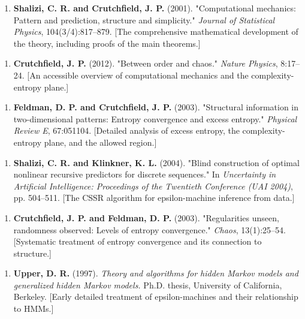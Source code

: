 \begin{enumerate}
\item \textbf{Shalizi, C. R. and Crutchfield, J. P.} (2001). "Computational mechanics: Pattern and prediction, structure and simplicity." \textit{Journal of Statistical Physics}, 104(3/4):817--879. [The comprehensive mathematical development of the theory, including proofs of the main theorems.]
\end{enumerate}

\begin{enumerate}
\item \textbf{Crutchfield, J. P.} (2012). "Between order and chaos." \textit{Nature Physics}, 8:17--24. [An accessible overview of computational mechanics and the complexity-entropy plane.]
\end{enumerate}

\begin{enumerate}
\item \textbf{Feldman, D. P. and Crutchfield, J. P.} (2003). "Structural information in two-dimensional patterns: Entropy convergence and excess entropy." \textit{Physical Review E}, 67:051104. [Detailed analysis of excess entropy, the complexity-entropy plane, and the allowed region.]
\end{enumerate}

\begin{enumerate}
\item \textbf{Shalizi, C. R. and Klinkner, K. L.} (2004). "Blind construction of optimal nonlinear recursive predictors for discrete sequences." In \textit{Uncertainty in Artificial Intelligence: Proceedings of the Twentieth Conference (UAI 2004)}, pp. 504--511. [The CSSR algorithm for epsilon-machine inference from data.]
\end{enumerate}

\begin{enumerate}
\item \textbf{Crutchfield, J. P. and Feldman, D. P.} (2003). "Regularities unseen, randomness observed: Levels of entropy convergence." \textit{Chaos}, 13(1):25--54. [Systematic treatment of entropy convergence and its connection to structure.]
\end{enumerate}

\begin{enumerate}
\item \textbf{Upper, D. R.} (1997). \textit{Theory and algorithms for hidden Markov models and generalized hidden Markov models.} Ph.D. thesis, University of California, Berkeley. [Early detailed treatment of epsilon-machines and their relationship to HMMs.]
\end{enumerate}

